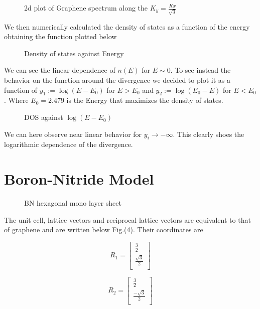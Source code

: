 \documentclass[a4paper]{article}
\begin{document}
\begin{figure}[h]
\centering
\caption{\label{fig:frog}2d plot of Graphene spectrum along the $K_{y}=\frac{K{x}}{\sqrt{3}}$ }
\end{figure}

We then numerically calculated the density of states as a function of the energy obtaining the function plotted below
\begin{figure}[h!]
\centering
\caption{\label{fig:frog}Density of states against Energy}
\end{figure}

We can see the linear dependence of $n(E)$ for $E \sim 0$. To see instead the behavior on the function around the divergence we decided to plot it as a function of $y_1:=\log(E-E_{0})$ for $E>E_0$ and $y_2:=\log(E_0-E)$ for $E<E_0$. Where $E_{0} = 2.479 $ is the Energy that maximizes the density of states.

\begin{figure}[h!]
\centering
\caption{\label{fig:frog}DOS against $\log(E-E_{0})$}
\end{figure}

We can here observe near linear behavior for $y_i\rightarrow-\infty$.
This clearly shoes the logarithmic dependence of the divergence.

\section{Boron-Nitride Model}

\begin{figure}[h!]
\centering
\caption{\label{BN} BN hexagonal mono layer sheet}
\end{figure}
The unit cell, lattice vectors and reciprocal lattice vectors are equivalent to that of graphene and are written below Fig.(\ref{BN}). Their coordinates are \\
\begin{minipage}{0.5\textwidth}
\centering
\begin{equation*}
R_1 =
\begin{bmatrix}
	\frac{3}{2} \\
    \frac{\sqrt{3}}{2}  \\
    
\end{bmatrix}
\end{equation*}

\end{minipage}
\begin{minipage}{0.5\textwidth}
\centering
\begin{equation*}
R_2 =
\begin{bmatrix}
    \frac{3}{2} \\
    \frac{-\sqrt{3}}{2}  \\
\end{bmatrix}
\end{equation*}
\end{minipage}
\end{document}
